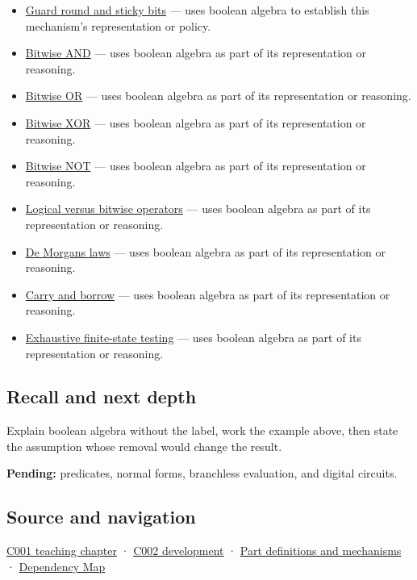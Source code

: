 \begin{itemize}
\item
  \hyperref[appendix-b572b631069b]{Guard round and sticky bits} --- uses boolean algebra to establish this mechanism's representation or policy.
\item
  \hyperref[appendix-68b52453737c]{Bitwise AND} --- uses boolean algebra as part of its representation or reasoning.
\item
  \hyperref[appendix-a427ce8ce8a6]{Bitwise OR} --- uses boolean algebra as part of its representation or reasoning.
\item
  \hyperref[appendix-d49161831368]{Bitwise XOR} --- uses boolean algebra as part of its representation or reasoning.
\item
  \hyperref[appendix-8f38927cfc54]{Bitwise NOT} --- uses boolean algebra as part of its representation or reasoning.
\item
  \hyperref[appendix-fe6b457d68d8]{Logical versus bitwise operators} --- uses boolean algebra as part of its representation or reasoning.
\item
  \hyperref[appendix-9079d3659da4]{De Morgan\textquotesingle s laws} --- uses boolean algebra as part of its representation or reasoning.
\item
  \hyperref[appendix-d52d5f78ffd1]{Carry and borrow} --- uses boolean algebra as part of its representation or reasoning.
\item
  \hyperref[appendix-05db24ccc28a]{Exhaustive finite-state testing} --- uses boolean algebra as part of its representation or reasoning.
\end{itemize}

\subsection{Recall and next depth}\label{appendix-24475e1596a8-recall-and-next-depth}

Explain boolean algebra without the label, work the example above, then state the assumption whose removal would change the result.

\textbf{Pending:} predicates, normal forms, branchless evaluation, and digital circuits.

\subsection{Source and navigation}\label{appendix-24475e1596a8-source-and-navigation}

\hyperref[01-foundations-i-ch001-from-a-signal-to-an-interpretation]{C001 teaching chapter} · \hyperref[01-foundations-i-ch001-arithmetic-becomes-a-policy]{C002 development} · \hyperref[appendix-fd090d982a15]{Part definitions and mechanisms} · \hyperref[appendix-4ad47bdd269a]{Dependency Map}
